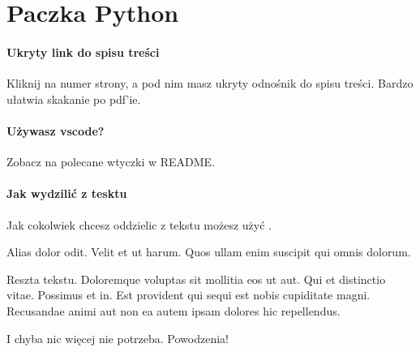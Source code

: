 \section{Paczka Python}

\paragraph{Ukryty link do spisu treści}
Kliknij na numer strony, a pod nim masz ukryty odnośnik do spisu treści. Bardzo ułatwia skakanie po pdf'ie.

\paragraph{Używasz vscode?}
Zobacz na polecane wtyczki w README.

\paragraph{Jak wydzilić z tesktu}
Jak cokolwiek chcesz oddzielic z tekstu możesz użyć .

\begin{onepage}[1cm]
    \centering
    Alias dolor odit. Velit et ut harum. Quos ullam enim suscipit qui omnis dolorum.
\end{onepage}

Reszta tekstu.
Doloremque voluptas sit mollitia eos ut aut. Qui et distinctio vitae. Possimus et in. Est provident qui sequi est nobis cupiditate magni. Recusandae animi aut non ea autem ipsam dolores hic repellendus.

I chyba nic więcej nie potrzeba. Powodzenia!
